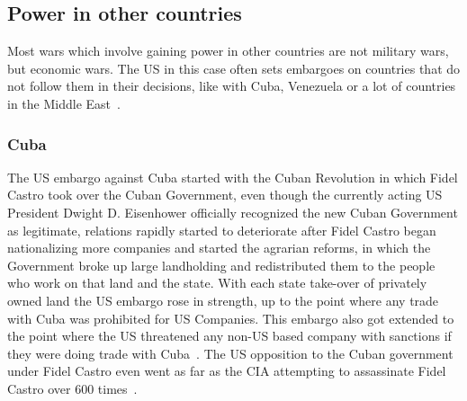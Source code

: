 \subsection{Power in other countries}
Most wars which involve gaining power in other countries are not military wars, but economic wars. The US in this case often sets embargoes on countries that do not follow them in their decisions, like with Cuba, Venezuela or a lot of countries in the Middle East~\autocite{us-treasury-embargoes}.
\subsubsection{Cuba}
The US embargo against Cuba started with the Cuban Revolution in which Fidel Castro took over the Cuban Government, even though the currently acting US President Dwight D. Eisenhower officially recognized the new Cuban Government as legitimate, relations rapidly started to deteriorate after Fidel Castro began nationalizing more companies and started the agrarian reforms, in which the Government broke up large landholding and redistributed them to the people who work on that land and the state. With each state take-over of privately owned land the US embargo rose in strength, up to the point where any trade with Cuba was prohibited for US Companies. This embargo also got extended to the point where the US threatened any non-US based company with sanctions if they were doing trade with Cuba~\autocite{cfr-us-cuba-relations}. The US opposition to the Cuban government under Fidel Castro even went as far as the CIA attempting to assassinate Fidel Castro over 600 times~\autocite{cnn-fidel-castro-assassination}.


